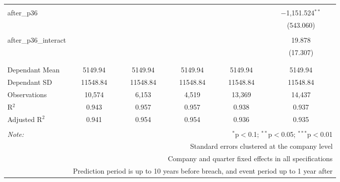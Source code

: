 \begin{table}[!htbp]
\begin{tabular}{@{\extracolsep{5pt}}lccccc}
  & & & & & \\ 
 after\_p36 &  &  &  &  & $-$1,151.524$^{**}$ \\ 
  &  &  &  &  & (543.060) \\ 
  & & & & & \\ 
 after\_p36\_interact &  &  &  &  & 19.878 \\ 
  &  &  &  &  & (17.307) \\ 
  & & & & & \\ 
\hline \\[-1.8ex] 
Dependant Mean & 5149.94 & 5149.94 & 5149.94 & 5149.94 & 5149.94 \\ 
Dependant SD & 11548.84 & 11548.84 & 11548.84 & 11548.84 & 11548.84 \\ 
Observations & 10,574 & 6,153 & 4,519 & 13,369 & 14,437 \\ 
R$^{2}$ & 0.943 & 0.957 & 0.957 & 0.938 & 0.937 \\ 
Adjusted R$^{2}$ & 0.941 & 0.954 & 0.954 & 0.936 & 0.935 \\ 
\hline 
\hline \\[-1.8ex] 
\textit{Note:}  & \multicolumn{5}{r}{$^{*}$p$<$0.1; $^{**}$p$<$0.05; $^{***}$p$<$0.01} \\ 
 & \multicolumn{5}{r}{Standard errors clustered at the company level} \\ 
 & \multicolumn{5}{r}{Company and quarter fixed effects in all specifications} \\ 
 & \multicolumn{5}{r}{Prediction period is up to 10 years before breach, and event period up to 1 year after} \\ 
\end{tabular} 
\end{table} 
